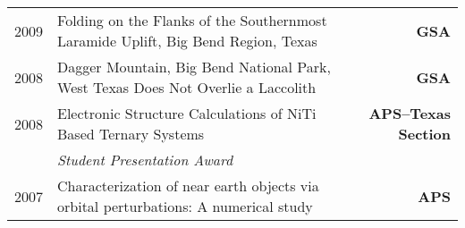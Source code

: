 \documentclass[10pt,letterpaper]{moderncv}
\begin{document}
\begin{tabularx}{\textwidth}{p{.33in}X>{\bfseries}r}
	  2009 & Folding on the Flanks of the Southernmost Laramide Uplift, Big Bend Region, Texas & GSA \\
	  
	  2008 & Dagger Mountain, Big Bend National Park, West Texas Does Not Overlie a Laccolith & GSA \\
	 
	 2008 & Electronic Structure Calculations of NiTi Based Ternary Systems  & APS--Texas Section \\
	 & \emph{Student Presentation Award} & \\
	 
	 2007 & Characterization of near earth objects via orbital perturbations: A numerical study & APS
	 
\end{tabularx}



\end{document}

